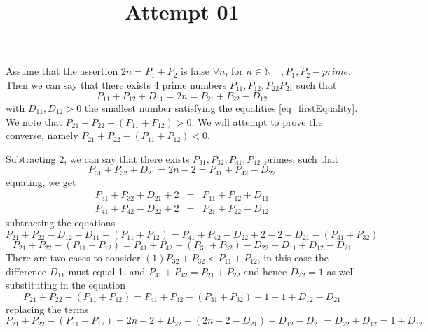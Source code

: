 \documentclass{report}
\begin{document}
\title{Attempt 01}
\maketitle
Assume that the assertion $2n=P_1+P_2$ is false $\forall n$, for $n\in\mathbb{N}\quad, P_1,P_2-prime$. Then we can say that there exists 4 prime numbers $P_{11},P_{12},P_{22} P_{21}$ such that 
\begin{equation}\label{eq_firstEquality}
P_{11}+P_{12}+D_{11}=2n=P_{21}+P_{22}-D_{12}
\end{equation}
with $D_{11},D_{12}>0$ the smallest number satisfying the equalities \ref{eq_firstEquality}. 
We note that $P_{21}+P_{22}-(P_{11}+P_{12})>0$. We will attempt to prove the converse, namely $P_{21}+P_{22}-(P_{11}+P_{12})<0$.

Subtracting 2, we can say that there exists $P_{31},P_{32},P_{41},P_{42}$ primes, such that 
\begin{equation}
P_{31}+P_{32}+D_{21}=2n-2=P_{41}+P_{42}-D_{22}
\end{equation}
equating, we get 
\begin{eqnarray}
P_{31}+P_{32}+D_{21}+2 &=& P_{11}+P_{12}+D_{11}\\
P_{41}+P_{42}-D_{22}+2 &=& P_{21}+P_{22}-D_{12}
\end{eqnarray}
subtracting the equations 
\begin{equation}
P_{21}+P_{22}-D_{12}-D_{11}-(P_{11}+P_{12})=P_{41}+P_{42}-D_{22}+2-2-D_{21}-(P_{31}+P_{32})
\end{equation}
\begin{equation}
P_{21}+P_{22}-(P_{11}+P_{12})= P_{41}+P_{42}-(P_{31}+P_{32})-D_{22}+D_{11}+D_{12}-D_{21}
\end{equation}
There are two cases to consider $(1)P_{32}+P_{32}<P_{11}+P_{12}$, in this case the difference $D_{11}$ must equal 1, and $P_{41}+P_{42}=P_{21}+P_{22}$ and hence $D_{22}=1$ as well. substituting in the equation
\begin{equation}
P_{21}+P_{22}-(P_{11}+P_{12})= P_{41}+P_{42}-(P_{31}+P_{32})-1+1+D_{12}-D_{21}
\end{equation}
replacing the terms 
\begin{equation*}
P_{21}+P_{22}-(P_{11}+P_{12})=2n-2+D_{22}-(2n-2 -D_{21})+D_{12}-D_{21}=D_{22}+D_{12}=1+D_{12}
\end{equation*}
\end{document}
